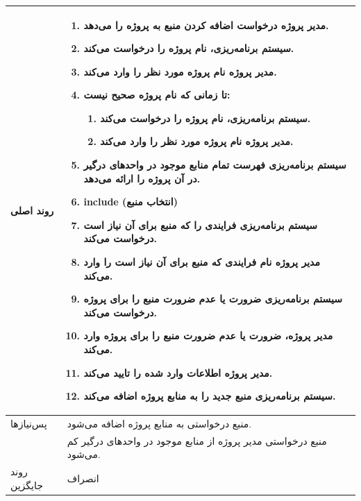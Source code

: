 \begin{table}[H]
\begin{tabular}{|p{3cm}|p{10cm}|}
		
		روند اصلی &
		\begin{enumerate}[topsep=0cm,leftmargin=0.5cm]
			\item مدیر پروژه درخواست اضافه کردن منبع به پروژه را می‌دهد.
			\item  سیستم برنامه‌ریزی، نام پروژه را درخواست می‌کند.
			\item مدیر پروژه نام پروژه‌ مورد نظر را وارد می‌کند.
			\item تا زمانی که نام پروژه صحیح نیست:
			\begin{enumerate}[topsep=0cm,leftmargin=0.5cm]
				\item سیستم برنامه‌ریزی، نام پروژه را درخواست می‌کند.
				\item مدیر پروژه نام پروژه‌ مورد نظر را وارد می‌کند.
			\end{enumerate}
			\item سیستم برنامه‌ریزی فهرست تمام منابع موجود در واحدهای درگیر در آن پروژه را ارائه می‌دهد.
			\item include (انتخاب منبع)
			\item  سیستم برنامه‌ریزی فرایندی را که منبع برای آن نیاز است درخواست می‌کند.
			\item  مدیر پروژه نام فرایندی که منبع برای آن نیاز است را وارد می‌کند.
			\item سیستم برنامه‌ریزی ضرورت یا عدم ضرورت منبع را برای پروژه درخواست می‌کند.
			\item مدیر پروژه، ضرورت یا عدم ضرورت منبع را برای پروژه وارد می‌کند.
			\item مدیر پروژه اطلاعات وارد شده را تایید می‌کند.
			\item سیستم برنامه‌ریزی منبع جدید را به منابع پروژه اضافه می‌کند.
			
		\end{enumerate} \\
		\hline
		
		پس‌نیازها &
		منبع درخواستی به منابع پروژه اضافه می‌شود. \\
		& منبع درخواستی مدیر پروژه از منابع موجود در واحدهای درگیر کم می‌شود.\\
		
		\hline
		
		روند جایگزین
		& انصراف \\
		\hline
		
	\end{tabular}
\end{table}



